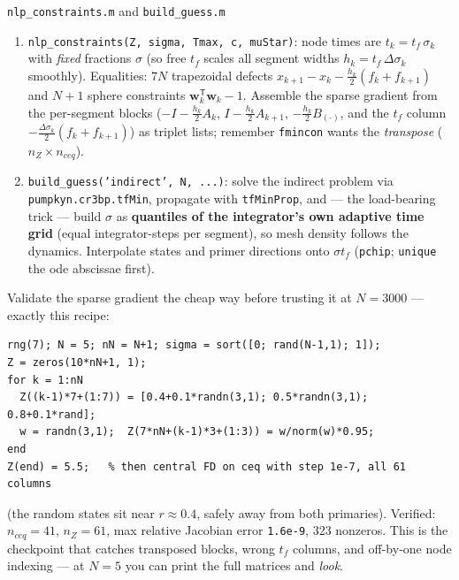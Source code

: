 \documentclass[11pt,letterpaper]{article}
\newcommand{\T}{^{\mathsf{T}}}
\begin{document}
\begin{exercise}{\texttt{nlp\_constraints.m} and \texttt{build\_guess.m}}
\begin{enumerate}[leftmargin=1.5em,nosep]
\item \texttt{nlp\_constraints(Z, sigma, Tmax, c, muStar)}: node times are
      $t_k = t_f\,\sigma_k$ with \emph{fixed} fractions $\sigma$
      (so free $t_f$ scales all segment widths $h_k = t_f\,\Delta\sigma_k$
      smoothly). Equalities: $7N$ trapezoidal defects
      $x_{k+1}-x_k-\frac{h_k}{2}(f_k+f_{k+1})$ and $N{+}1$ sphere
      constraints $\mathbf w_k\T\mathbf w_k - 1$. Assemble the sparse
      gradient from the per-segment blocks
      ($-I-\frac{h_k}{2}A_k$, $I-\frac{h_k}{2}A_{k+1}$,
      $-\frac{h_k}{2}B_{(\cdot)}$, and the $t_f$ column
      $-\frac{\Delta\sigma_k}{2}(f_k+f_{k+1})$) as triplet lists;
      remember \texttt{fmincon} wants the \emph{transpose} ($n_Z \times
      n_{ceq}$).
\item \texttt{build\_guess('indirect', N, ...)}: solve the indirect
      problem via \texttt{pumpkyn.cr3bp.tfMin}, propagate with
      \texttt{tfMinProp}, and --- the load-bearing trick --- build
      $\sigma$ as \textbf{quantiles of the integrator's own adaptive time
      grid} (equal integrator-steps per segment), so mesh density follows
      the dynamics. Interpolate states and primer directions onto
      $\sigma t_f$ (\texttt{pchip}; \texttt{unique} the ode abscissae
      first).
\end{enumerate}
\end{exercise}

\begin{hint}
Validate the sparse gradient the cheap way before trusting it at
$N=3000$ --- exactly this recipe:
\begin{verbatim}
rng(7); N = 5; nN = N+1; sigma = sort([0; rand(N-1,1); 1]);
Z = zeros(10*nN+1, 1);
for k = 1:nN
  Z((k-1)*7+(1:7)) = [0.4+0.1*randn(3,1); 0.5*randn(3,1); 0.8+0.1*rand];
  w = randn(3,1);  Z(7*nN+(k-1)*3+(1:3)) = w/norm(w)*0.95;
end
Z(end) = 5.5;   % then central FD on ceq with step 1e-7, all 61 columns
\end{verbatim}
(the random states sit near $r \approx 0.4$, safely away from both
primaries). Verified: $n_{ceq} = 41$, $n_Z = 61$, max relative Jacobian
error \texttt{1.6e-9}, 323 nonzeros. This is the checkpoint that catches
transposed blocks, wrong $t_f$ columns, and off-by-one node indexing ---
at $N=5$ you can print the full matrices and \emph{look}.
\end{hint}
\end{document}
